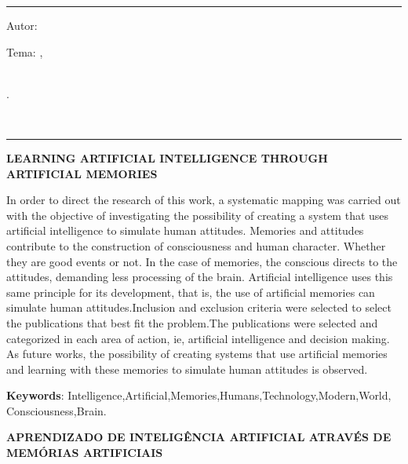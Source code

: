 

\hrule	%
\begin{center} %
\begin{minipage}[c]{12.5cm} %
Autor: \imprimirautor

Tema: \imprimirtitulo 
\imprimirlocal,\\ 
\imprimirorientador\\
\hspace{0.5cm}
\parbox[t]{\textwidth}{\imprimirinstituicao
\imprimirdata.}\\
\hspace{0.5cm}
\end{minipage}
\end{center}
\hrule

\vspace{1cm}

\SingleSpacing
\noindent
{\textbf{LEARNING ARTIFICIAL INTELLIGENCE THROUGH ARTIFICIAL MEMORIES}}
\indent
\small

In order to direct the research of this work, a systematic mapping was carried out with the objective of investigating the possibility of creating a system that uses artificial intelligence to simulate human attitudes. Memories and attitudes contribute to the construction of consciousness and human character. Whether they are good events or not. In the case of memories, the conscious directs to the attitudes, demanding less processing of the brain. Artificial intelligence uses this same principle for its development, that is, the use of artificial memories can simulate human attitudes.Inclusion and exclusion criteria were selected to select the publications that best fit the problem.The publications were selected and categorized in each area of action, ie, artificial intelligence and decision making. As future works, the possibility of creating systems that use artificial memories and learning with these memories to simulate human attitudes is observed.

\noindent
 
\textbf{Keywords}: Intelligence,Artificial,Memories,Humans,Technology,Modern,World,
\\Consciousness,Brain.

\SingleSpacing
\noindent
{\textbf{APRENDIZADO DE INTELIGÊNCIA ARTIFICIAL ATRAVÉS DE MEMÓRIAS ARTIFICIAIS}}
\indent
\small

